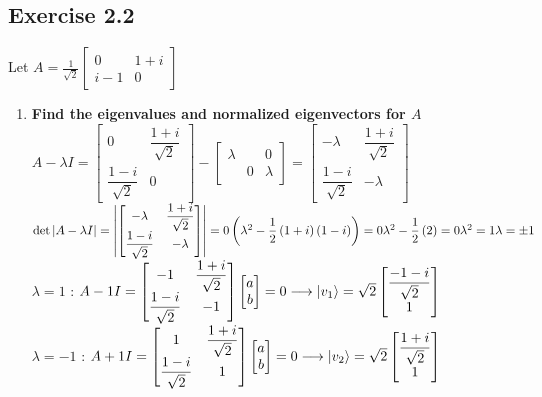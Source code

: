 \documentclass[12pt]{article}
\theoremstyle{plain}
\theoremstyle{nonumberplain}
\theoremstyle{plain}
\theoremstyle{nonumberplain}
\newcommand\1{{\bf 1}}
\newcommand{\bmat}[1]{\begin{bmatrix*} #1 \end{bmatrix*}} %
\newcommand{\<}{\left\langle}
\renewcommand{\>}{\right\rangle}
\begin{document}

\subsection{Exercise 2.2}
Let $A=\frac{1}{\sqrt{2}}\bmat{0 & 1+i \\ i-1 & 0}$
\begin{enumerate}[label=(\alph*)]
\item \textbf{Find the eigenvalues and normalized eigenvectors for $A$} \\
$A-\lambda I=\begin{bmatrix}
0 & \dfrac{1+i}{\sqrt{2}} \\
\dfrac{1-i}{\sqrt{2}} & 0
\end{bmatrix}-\begin{bmatrix}
\lambda  &  & 0 \\
 & 0 & \lambda 
\end{bmatrix}=\begin{bmatrix}
-\lambda  & \dfrac{1+i}{\sqrt{2}} \\
\dfrac{1-i}{\sqrt{2}} & -\lambda 
\end{bmatrix}$\\$\det \left| A-\lambda I\right| =\left| \begin{bmatrix}
-\lambda  & \dfrac{1+i}{\sqrt{2}} \\
\dfrac{1-i}{\sqrt{2}} & -\lambda 
\end{bmatrix}\right| =0\\
\left( \lambda ^{2}-\dfrac{1}{2}\left( 1+i\right) \left( 1-i\right) \right) =0\\
\lambda ^{2}-\dfrac{1}{2}\left( 2\right) =0\\
\lambda ^{2}=1\\
\lambda =\pm 1$ \\
$\lambda=1$ : $A-1I=\bmat{-1 & \dfrac{1+i}{\sqrt{2}} \\ \dfrac{1-i}{\sqrt{2}} & -1}\bmat{a \\ b}=0\longrightarrow\ket{v_1}=\sqrt{2}\bmat{\dfrac{-1-i}{\sqrt{2}} \\ 1}$ \\
$\lambda=-1$ : $A+1I=\bmat{1 & \dfrac{1+i}{\sqrt{2}} \\ \dfrac{1-i}{\sqrt{2}} & 1}\bmat{a \\ b}=0\longrightarrow\ket{v_2}=\sqrt{2}\bmat{\dfrac{1+i}{\sqrt{2}} \\ 1}$


\end{enumerate}
\end{document}
